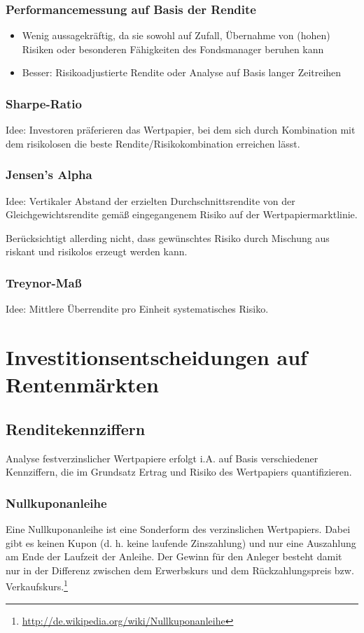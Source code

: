 \subsubsection{Performancemessung auf Basis der Rendite}
\begin{itemize}
	\item Wenig aussagekräftig, da sie sowohl auf Zufall, Übernahme von (hohen) Risiken oder besonderen Fähigkeiten des Fondsmanager beruhen kann
	\item Besser: Risikoadjustierte Rendite oder Analyse auf Basis langer Zeitreihen
\end{itemize}

\subsubsection{Sharpe-Ratio}
Idee: Investoren präferieren das Wertpapier, bei dem sich durch Kombination mit dem risikolosen die beste Rendite/Risikokombination erreichen lässt.

\subsubsection{Jensen's Alpha}
Idee: Vertikaler Abstand der erzielten Durchschnittsrendite von der Gleichgewichtsrendite gemäß eingegangenem Risiko auf der Wertpapiermarktlinie.

Berücksichtigt allerding nicht, dass gewünschtes Risiko durch Mischung aus riskant und risikolos erzeugt werden kann.

\subsubsection{Treynor-Maß}
Idee: Mittlere Überrendite pro Einheit systematisches Risiko.



\section{Investitionsentscheidungen auf Rentenmärkten}

\subsection{Renditekennziffern}
Analyse festverzinslicher Wertpapiere erfolgt i.A. auf Basis verschiedener Kennziffern, die im Grundsatz Ertrag und Risiko des Wertpapiers quantifizieren.

\subsubsection{Nullkuponanleihe}
Eine Nullkuponanleihe  ist eine Sonderform des verzinslichen Wertpapiers. Dabei gibt es keinen Kupon (d. h. keine laufende Zinszahlung) und nur eine Auszahlung am Ende der Laufzeit der Anleihe. Der Gewinn für den Anleger besteht damit nur in der Differenz zwischen dem Erwerbskurs und dem Rückzahlungspreis bzw. Verkaufskurs.\footnote{\url{http://de.wikipedia.org/wiki/Nullkuponanleihe}}

